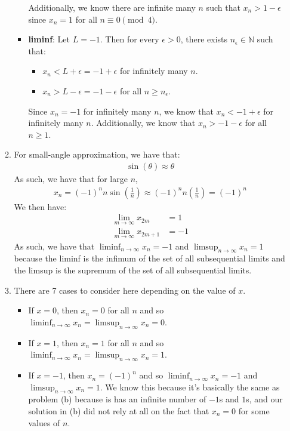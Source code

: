\documentclass{article}%
\begin{document}
\begin{enumerate}
\begin{enumerate}
\begin{itemize}
            Additionally, we know there are infinite many $n$ such that $x_n > 1 - \epsilon$ since $x_n = 1$ for all $n \equiv 0 \pmod{4}$.
            \item \textbf{liminf}: Let $L = -1$. Then for every $\epsilon > 0$, there exists $n_\epsilon \in \mathbb{N}$ such that:
            \begin{itemize}
                \item $x_n < L + \epsilon = -1 + \epsilon$ for infinitely many $n$.
                \item $x_n > L - \epsilon = -1 - \epsilon$ for all $n \geq n_\epsilon$.
            \end{itemize}
            Since $x_n = -1$ for infinitely many $n$, we know that $x_n < -1 + \epsilon$ for infinitely many $n$. Additionally, we know that $x_n > -1 - \epsilon$ for all $n \geq 1$.
        \end{itemize}
        \item For small-angle approximation, we have that:
        \begin{align*}
            \sin(\theta) \approx \theta \tag{for small $\theta$}
        \end{align*}
        As such, we have that for large $n$, \begin{align*}
            x_n = (-1)^n n \sin\left(\frac{1}{n}\right) \approx (-1)^n n \left(\frac{1}{n}\right) = (-1)^n
        \end{align*}
        We then have:
        \begin{align*}
            \lim_{m \to \infty} x_{2m} &= 1\\
            \lim_{m \to \infty} x_{2m + 1} &= -1
        \end{align*}
        As such, we have that $\liminf_{n\to\infty}x_n = -1$ and $\limsup_{n\to\infty}x_n = 1$ because the liminf is the infimum of the set of all subsequential limits and the limsup is the supremum of the set of all subsequential limits.
        \item There are 7 cases to consider here depending on the value of $x$. 
        \begin{itemize}
            \item If $x = 0$, then $x_n = 0$ for all $n$ and so $\liminf_{n\to\infty}x_n = \limsup_{n\to\infty}x_n = 0$.
            \item If $x = 1$, then $x_n = 1$ for all $n$ and so $\liminf_{n\to\infty}x_n = \limsup_{n\to\infty}x_n = 1$.
            \item If $x = -1$, then $x_n = (-1)^n$ and so $\liminf_{n\to\infty}x_n = -1$ and $\limsup_{n\to\infty}x_n = 1$. We know this because it's basically the same as problem (b) because is has an infinite number of $-1$s and $1$s, and our solution in (b) did not rely at all on the fact that $x_n = 0$ for some values of $n$.

\end{itemize}
\end{enumerate}
\end{enumerate}
\end{document}

